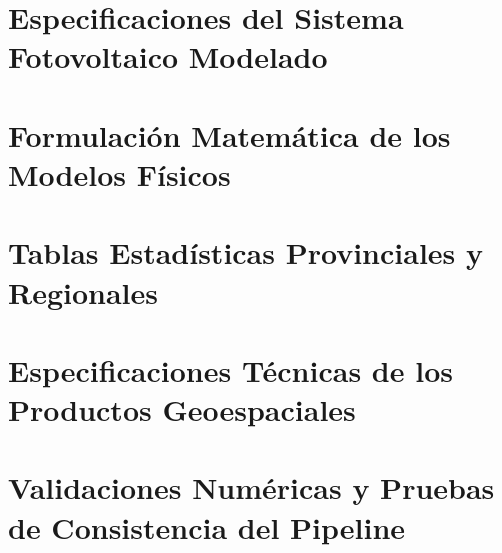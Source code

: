\documentclass[11pt,a4paper]{article}
\begin{document}

\appendix

\section{Especificaciones del Sistema Fotovoltaico Modelado}
\section{Formulación Matemática de los Modelos Físicos}
\section{Tablas Estadísticas Provinciales y Regionales}
\section{Especificaciones Técnicas de los Productos Geoespaciales}
\section{Validaciones Numéricas y Pruebas de Consistencia del Pipeline}
\end{document}
